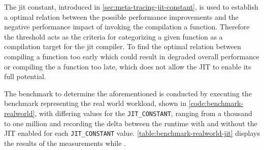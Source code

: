 The jit constant, introduced in \autoref{sec:meta-tracing-jit-constant}, is
used to establish a optimal relation between the possible performance
improvements and the negative performance impact of invoking the compilation a
function. Therefore the threshold acts as the criteria for categorizing a given
function as a compilation target for the jit compiler. To find the optimal
relation between compiling a function too early which could result in degraded
overall performance or compiling the a function too late, which does not allow
the JIT to enable its full potential.

The benchmark to determine the aforementioned is conducted by executing the
benchmark representing the real world workload, shown in
\autoref{code:benchmark-realworld}, with differing values for the
\texttt{JIT\_CONSTANT}, ranging from a thousand to one million and recording
the delta between the runtime with and without the JIT enabled for each
\texttt{JIT\_CONSTANT} value. \autoref{table:benchmark-realworld-jit} displays
the results of the measurements while .

